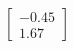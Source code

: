 \documentclass[preview]{standalone}
\begin{document}
\begin{align*}
\begin{bmatrix} -0.45 \\ 1.67 \end{bmatrix}
\end{align*}
\end{document}
